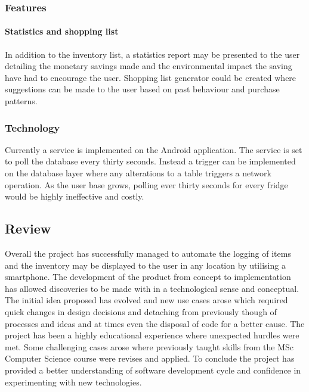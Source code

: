 \documentclass[a4paper, 11pt]{article}
\begin{document}
\subsubsection{Features}
\paragraph{Statistics and shopping list}
In addition to the inventory list, a statistics report may be presented to the user detailing the monetary savings made and the environmental impact the saving have had to encourage the user. Shopping list generator could be created where suggestions can be made to the user based on past behaviour and purchase patterns. 

\subsubsection{Technology}
Currently a service is implemented on the Android application. The service is set to poll the database every thirty seconds. Instead a trigger can be implemented on the database layer where any alterations to a table triggers a network operation. As the user base grows, polling ever thirty seconds for every fridge would be highly ineffective and costly.  

\subsection{Review}
Overall the project has successfully managed to automate the logging of items and the inventory may be displayed to the user in any location by utilising a smartphone. The development of the product from concept to implementation has allowed discoveries to be made with in a technological sense and conceptual. The initial idea proposed has evolved and new use cases arose which required quick changes in design decisions and detaching from previously though of processes and ideas and at times even the disposal of code for a better cause. 
The project has been a highly educational experience where unexpected hurdles were met. Some challenging cases arose where previously taught skills from the MSc Computer Science course were revises and applied. To conclude the project has provided a better understanding of software development cycle and confidence in experimenting with new technologies.    

\vspace{\baselineskip}
\vspace{\baselineskip}
\vspace{\baselineskip}
\end{document}
